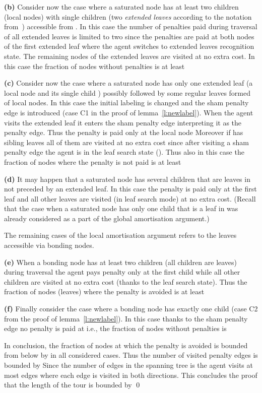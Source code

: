 \documentclass[11pt,envcountsame,oribibl]{llncs}
\begin{document}
\noindent
{\bf (b)} Consider now the case where a saturated node  has
at least two children (local nodes) with single children (two {\sl extended
leaves} according to the notation from~\cite{GKMNZ08})
accessible from . In this case the number of penalties
paid during
traversal of all extended leaves is limited to two since the penalties
are paid at
both nodes of the first extended leaf where the agent switches to
extended leaves
recognition state. The remaining nodes of the extended leaves are visited
at no extra cost.
In this case the fraction of nodes without penalties is at least



\noindent
{\bf (c)} Consider now the case where a saturated node has only one
extended
leaf (a local node  and its single child ) possibly followed by
some regular
leaves formed of local nodes. In this case the initial labeling is
changed and
the sham penalty edge  is introduced (case C1 in the proof of
lemma~\ref{l:newlabel}).
When the agent visits the extended leaf it enters the
sham penalty edge
interpreting it as the penalty edge. Thus the penalty is paid only at
the local
node  Moreover if  has sibling leaves all of them are visited at
no extra
cost since after visiting a sham penalty edge the agent is in the leaf search
state (\cite{GKMNZ08}).
Thus also in this case the fraction of nodes where the penalty is not paid
is at least 


\noindent
{\bf (d)} It may happen that a saturated node has several
children that
are leaves in  not preceded by an extended leaf. In this case the
penalty is paid
only at the first leaf and all other leaves are visited (in leaf search
mode)
at no extra cost.
(Recall that the case when a saturated node has only one child that is a
leaf in 
was already considered as a part of the global amortisation argument.)

The remaining cases of the local amortisation argument refers to the leaves
accessible via bonding nodes.

\noindent
{\bf (e)} When a bonding node has at least two children (all children
are leaves)
during traversal the agent pays penalty only at the first child while
all other children
are visited at no extra cost (thanks to the leaf search state).
Thus the fraction of nodes (leaves) where the penalty is avoided is at
least 


\noindent
{\bf (f)} Finally consider the case where a bonding node  has exactly
one child 
(case C2 from the proof of lemma~\ref{l:newlabel}).
In this case thanks to the sham penalty edge  no penalty is paid at 
i.e., the fraction of nodes without penalties is 

In conclusion, the fraction of nodes at which the penalty is avoided is
bounded
from below by  in all considered cases. Thus the number of
visited penalty
edges is bounded by  Since the number of edges in the
spanning tree is
 the agent visits at most  edges where each edge is
visited in
both directions. This concludes the proof that the length of the tour is
bounded by  \hfill\qed
\end{document}
